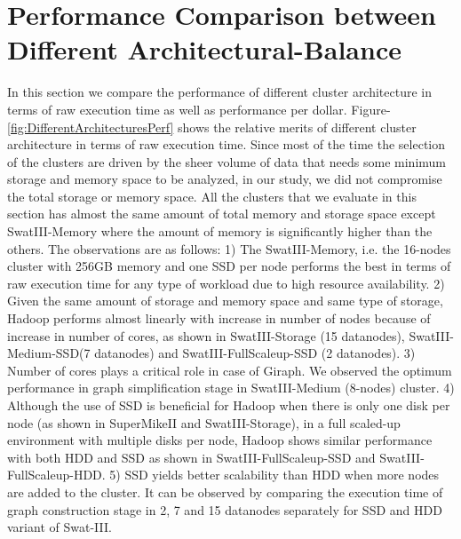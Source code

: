 \documentclass[conference]{IEEEtran}
\begin{document}
\section {Performance Comparison between Different Architectural-Balance} \label{ComparingDifferentArchitecturalBalance}
In this section we compare the performance of different cluster architecture in terms of raw execution time as well as performance per dollar.
Figure-\ref{fig:DifferentArchitecturesPerf} shows the relative merits of different cluster architecture in terms of raw execution time.
Since most of the time the selection of the clusters are driven by the sheer volume of data that needs some minimum storage and memory space to be analyzed, in our study, we did not compromise the total storage or memory space. All the clusters that we evaluate in this section has almost the same amount of total memory and storage space except SwatIII-Memory where the amount of memory is significantly higher than the others.
The observations are as follows:
1) The SwatIII-Memory, i.e. the 16-nodes cluster with 256GB memory and one SSD per node performs the best in terms of raw execution time for any type of workload due to high resource availability.
2) Given the same amount of storage and memory space and same type of storage, Hadoop performs almost linearly with increase in number of nodes because of increase in number of cores, as shown in SwatIII-Storage (15 datanodes), SwatIII-Medium-SSD(7 datanodes) and SwatIII-FullScaleup-SSD (2 datanodes).
3) Number of cores plays a critical role in case of Giraph. We observed the optimum performance in graph simplification stage in SwatIII-Medium (8-nodes) cluster.
4) Although the use of SSD is beneficial for Hadoop when there is only one disk per node (as shown in SuperMikeII and SwatIII-Storage), in a full scaled-up environment with multiple disks per node, Hadoop shows similar performance with both HDD and SSD as shown in SwatIII-FullScaleup-SSD and SwatIII-FullScaleup-HDD.
5) SSD yields better scalability than HDD when more nodes are added to the cluster. It can be observed by comparing the execution time of graph construction stage in 2, 7 and 15 datanodes separately for SSD and HDD variant of Swat-III. 
\end{document}
